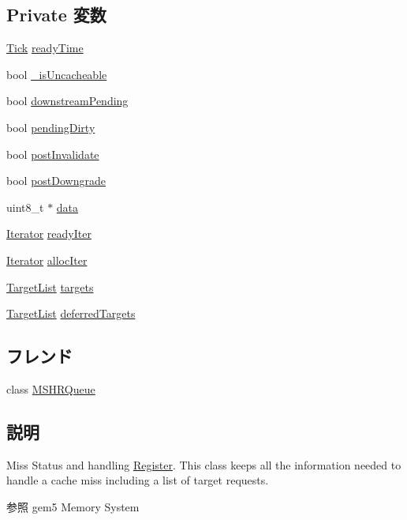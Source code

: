 \subsection*{Private 変数}
\begin{DoxyCompactItemize}
\item 
\hyperlink{base_2types_8hh_a5c8ed81b7d238c9083e1037ba6d61643}{Tick} \hyperlink{classMSHR_a7cb362ebfb8750bd53baf5e8f96e00d0}{readyTime}
\item 
bool \hyperlink{classMSHR_a1f29f1c59828a6c0fecd2d33c992c8a4}{\_\-isUncacheable}
\item 
bool \hyperlink{classMSHR_a5ea3d1c4eadd163d5f9bd35927044ed5}{downstreamPending}
\item 
bool \hyperlink{classMSHR_a2c6e696fb220ec9db6d72d614998c800}{pendingDirty}
\item 
bool \hyperlink{classMSHR_af4c42f3027a6f426f32521a251fd724d}{postInvalidate}
\item 
bool \hyperlink{classMSHR_a361fccb7e46b8119bda165f80f2753ac}{postDowngrade}
\item 
uint8\_\-t $\ast$ \hyperlink{classMSHR_abe222f6d3581e7920dcad5306cc906a8}{data}
\item 
\hyperlink{classMSHR_af944263ff3027ab76cf07354d3a3f0c6}{Iterator} \hyperlink{classMSHR_a6ff6af8d20926ded4e18e8f676784ff6}{readyIter}
\item 
\hyperlink{classMSHR_af944263ff3027ab76cf07354d3a3f0c6}{Iterator} \hyperlink{classMSHR_afd1f01c04c4b2b391083188321ccd47e}{allocIter}
\item 
\hyperlink{classMSHR_1_1TargetList}{TargetList} \hyperlink{classMSHR_ac0771ddfd90fe1ffe0d2da35dad7dd36}{targets}
\item 
\hyperlink{classMSHR_1_1TargetList}{TargetList} \hyperlink{classMSHR_ab53d68e3f8e523ab7907b830d22bd35d}{deferredTargets}
\end{DoxyCompactItemize}
\subsection*{フレンド}
\begin{DoxyCompactItemize}
\item 
class \hyperlink{classMSHR_a3d057950abc60f70219bad94198fd407}{MSHRQueue}
\end{DoxyCompactItemize}


\subsection{説明}
Miss Status and handling \hyperlink{classRegister}{Register}. This class keeps all the information needed to handle a cache miss including a list of target requests. \begin{DoxySeeAlso}{参照}
gem5 Memory System 
\end{DoxySeeAlso}


